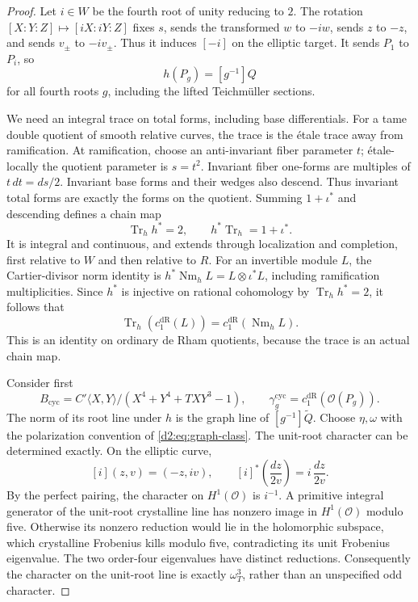 \documentclass[11pt,a4paper]{amsart}
\numberwithin{equation}{section}
\theoremstyle{definition}
\theoremstyle{remark}
\newcommand{\DtwocO}{\mathcal O}
\newcommand{\Dtwowt}{\widetilde}
\newcommand{\DtwodR}{\mathrm{dR}}
\newcommand{\Dtwocyc}{\mathrm{cyc}}
\DeclareMathOperator{\DtwoTr}{Tr}
\DeclareMathOperator{\DtwoNm}{Nm}
\begin{document}
\begin{proof}
Let \(i\in W\) be the fourth root of unity reducing to \(2\).
The rotation
\([X:Y:Z]\mapsto[iX:iY:Z]\) fixes \(s\), sends the transformed
\(w\) to \(-iw\), sends \(z\) to \(-z\), and sends \(v_\pm\) to
\(-iv_\pm\).
Thus it induces \([-i]\) on the elliptic target.
It sends \(P_1\) to \(P_i\), so
\begin{equation}\label{d2:eq:root-equivariance}
 h(P_g)=[g^{-1}]Q
\end{equation}
for all fourth roots \(g\), including the lifted Teichm\"uller
sections.

We need an integral trace on total forms, including base
differentials.
For a tame double quotient of smooth relative curves, the trace is
the \'etale trace away from ramification.
At ramification, choose an anti-invariant fiber parameter \(t\);
\'etale-locally the quotient parameter is \(s=t^2\).
Invariant fiber one-forms are multiples of
\(t\,dt=ds/2\).
Invariant base forms and their wedges also descend.
Thus invariant total forms are exactly the forms on the quotient.
Summing \(1+\iota^*\) and descending defines a chain map
\[
 \DtwoTr_hh^*=2,\qquad h^*\DtwoTr_h=1+\iota^*.
\]
It is integral and continuous, and extends through localization and
completion, first relative to \(W\) and then relative to \(R\).
For an invertible module \(L\), the Cartier-divisor norm identity is
\(h^*\DtwoNm_hL=L\otimes\iota^*L\), including ramification
multiplicities.
Since \(h^*\) is injective on rational cohomology by
\(\DtwoTr_hh^*=2\), it follows that
\begin{equation}\label{d2:eq:trace-chern}
 \DtwoTr_h(c_1^\DtwodR(L))=c_1^\DtwodR(\DtwoNm_hL).
\end{equation}
This is an identity on ordinary de Rham quotients, because the trace
is an actual chain map.

Consider first
\[
 B_{\Dtwocyc}=
 C'\langle X,Y\rangle/(X^4+Y^4+TXY^3-1),
 \qquad
 \gamma_g^\Dtwocyc=c_1^\DtwodR(\DtwocO(P_g)).
\]
The norm of its root line under \(h\) is the graph line of
\([g^{-1}]\Dtwowt Q\).
Choose \(\eta,\omega\) with the polarization convention of
\eqref{d2:eq:graph-class}.
The unit-root character can be determined exactly.
On the elliptic curve,
\[
 [i](z,v)=(-z,iv),\qquad
 [i]^*\!\left(\frac{dz}{2v}\right)
       =i\,\frac{dz}{2v}.
\]
By the perfect pairing, the character on \(H^1(\DtwocO)\) is
\(i^{-1}\).
A primitive integral generator of the unit-root crystalline line
has nonzero image in \(H^1(\DtwocO)\) modulo five.
Otherwise its nonzero reduction would lie in the holomorphic
subspace, which crystalline Frobenius kills modulo five,
contradicting its unit Frobenius eigenvalue.
The two order-four eigenvalues have distinct reductions.
Consequently the character on the unit-root line is exactly
\(\omega_T^3\), rather than an unspecified odd character.


\end{proof}
\end{document}
